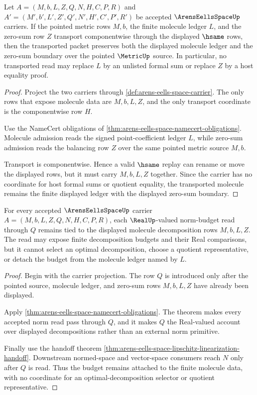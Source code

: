 \begin{theorem}
\label{thm:arens-eells-molecule-zero-sum-transport}
Let $A=(M,b,L,Z,Q,N,H,C,P,R)$ and $A'=(M',b',L',Z',Q',N',H',C',P',R')$ be accepted $\ArensEellsSpaceUp$ carriers. If the pointed metric rows $M,b$, the finite molecule ledger $L$, and the zero-sum row $Z$ transport componentwise through the displayed $\hsame$ rows, then the transported packet preserves both the displayed molecule ledger and the zero-sum boundary over the pointed $\MetricUp$ source. In particular, no transported read may replace $L$ by an unlisted formal sum or replace $Z$ by a host equality proof.
\end{theorem}
\begin{proof}
Project the two carriers through \autoref{def:arens-eells-space-carrier}. The only rows that expose molecule data are $M,b,L,Z$, and the only transport coordinate is the componentwise row $H$.

Use the NameCert obligations of \autoref{thm:arens-eells-space-namecert-obligations}. Molecule admission reads the signed point-coefficient ledger $L$, while zero-sum admission reads the balancing row $Z$ over the same pointed metric source $M,b$.

Transport is componentwise. Hence a valid $\hsame$ replay can rename or move the displayed rows, but it must carry $M,b,L,Z$ together. Since the carrier has no coordinate for host formal sums or quotient equality, the transported molecule remains the finite displayed ledger with the displayed zero-sum boundary.
\end{proof}

\begin{theorem}
\label{thm:arens-eells-norm-budget-stability}
For every accepted $\ArensEellsSpaceUp$ carrier $A=(M,b,L,Z,Q,N,H,C,P,R)$, each $\RealUp$-valued norm-budget read through $Q$ remains tied to the displayed molecule decomposition rows $M,b,L,Z$. The read may expose finite decomposition budgets and their Real comparisons, but it cannot select an optimal decomposition, choose a quotient representative, or detach the budget from the molecule ledger named by $L$.
\end{theorem}
\begin{proof}
Begin with the carrier projection. The row $Q$ is introduced only after the pointed source, molecule ledger, and zero-sum rows $M,b,L,Z$ have already been displayed.

Apply \autoref{thm:arens-eells-space-namecert-obligations}. The theorem makes every accepted norm read pass through $Q$, and it makes $Q$ the Real-valued account over displayed decompositions rather than an external norm primitive.

Finally use the handoff theorem \autoref{thm:arens-eells-space-lipschitz-linearization-handoff}. Downstream normed-space and vector-space consumers reach $N$ only after $Q$ is read. Thus the budget remains attached to the finite molecule data, with no coordinate for an optimal-decomposition selector or quotient representative.
\end{proof}


